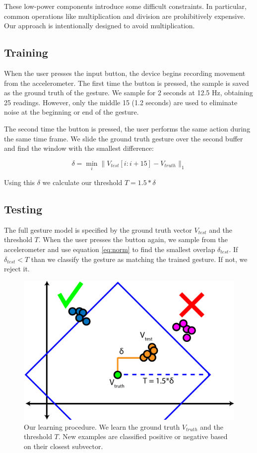 \documentclass[12pt]{article}
\begin{document}
These low-power components introduce some difficult constraints. In particular, common operations like multiplication and division are prohibitively expensive. Our approach is intentionally designed to avoid multiplication.

\subsection{Training}
When the user presses the input button, the device begins recording movement from the accelerometer. The first time the button is pressed, the sample is saved as the ground truth of the gesture. We sample for 2 seconds at 12.5 Hz, obtaining 25 readings. However, only the middle 15 (1.2 seconds) are used to eliminate noise at the beginning or end of the gesture.

The second time the button is pressed, the user performs the same action during the same time frame. We slide the ground truth gesture over the second buffer and find the window with the smallest difference:

\begin{equation}
\label{eq:norm}
\delta = \min_i \|V_{test}[i:i+15] - V_{truth} \|_1
\end{equation}

Using this $\delta$ we calculate our threshold $T = 1.5*\delta$

\subsection{Testing}
The full gesture model is specified by the ground truth vector $V_{test}$ and the threshold $T$. When the user presses the button again, we sample from the accelerometer and use equation \ref{eq:norm} to find the smallest overlap $\delta_{test}$. If $\delta_{test} < T$ than we classify the gesture as matching the trained gesture. If not, we reject it.

\begin{figure}[h]
\begin{center}
\includegraphics[width=.7\linewidth]{graph}
\end{center}
\caption{Our learning procedure. We learn the ground truth $V_{truth}$ and the threshold $T$. New examples are classified positive or negative based on their closest subvector.}
\label{graph}
\end{figure}
\end{document}
